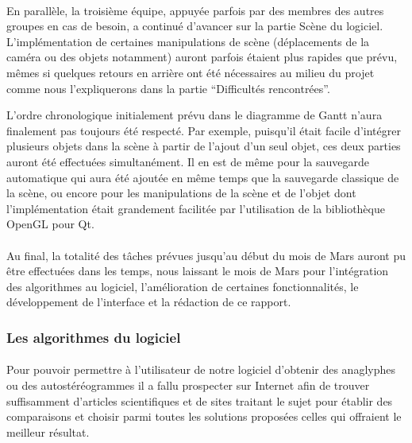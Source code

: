 \paragraph{}
En parallèle, la troisième équipe, appuyée parfois par des membres des autres groupes en cas de besoin, a continué d'avancer sur la partie Scène du logiciel. L'implémentation de certaines manipulations de scène (déplacements de la caméra ou des objets notamment) auront parfois étaient plus rapides que prévu, mêmes si quelques retours en arrière ont été nécessaires au milieu du projet comme nous l'expliquerons dans la partie ``Difficultés rencontrées''.

L'ordre chronologique initialement prévu dans le diagramme de Gantt n'aura finalement pas toujours été respecté. Par exemple, puisqu'il était facile d'intégrer plusieurs objets dans la scène à partir de l'ajout d'un seul objet, ces deux parties auront été effectuées simultanément. Il en est de même pour la sauvegarde automatique qui aura été ajoutée en même temps que la sauvegarde classique de la scène, ou encore pour les manipulations de la scène et de l'objet dont l'implémentation était grandement facilitée par l'utilisation de la bibliothèque OpenGL pour Qt.

\paragraph{}
Au final, la totalité des tâches prévues jusqu'au début du mois de Mars auront pu être effectuées dans les temps, nous laissant le mois de Mars pour l'intégration des algorithmes au logiciel, l'amélioration de certaines fonctionnalités, le développement de l'interface et la rédaction de ce rapport.



\subsubsection{Les algorithmes du logiciel}
\paragraph{}
Pour pouvoir permettre à l'utilisateur de notre logiciel d'obtenir des anaglyphes ou des autostéréogrammes il a fallu prospecter sur Internet afin de trouver suffisamment d'articles scientifiques et de sites traitant le sujet pour établir des comparaisons et choisir parmi toutes les solutions proposées celles qui offraient le meilleur résultat.


